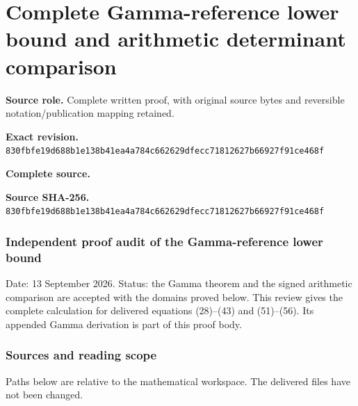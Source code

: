 \begingroup

\section{Complete Gamma-reference lower bound and arithmetic determinant comparison}


\begingroup
\sloppy
\small

\noindent\textbf{Source role.} Complete written proof, with original source bytes and reversible notation/publication mapping retained.\par
\noindent\textbf{Exact revision.} \nolinkurl{830fbfe19d688b1e138b41ea4a784c662629dfecc71812627b66927f91ce468f}\par
\noindent\textbf{Complete source.} \par
\noindent\textbf{Source SHA-256.} \nolinkurl{830fbfe19d688b1e138b41ea4a784c662629dfecc71812627b66927f91ce468f}\par\medskip
\subsubsection{Independent proof audit of the Gamma-reference lower bound}\label{endpoint-gamma_review--independent-proof-audit-of-the-gamma-reference-lower-bound}

Date: 13 September 2026. Status: the Gamma theorem and the signed arithmetic comparison are accepted with the domains proved below. This review gives the complete calculation for delivered equations (28)--(43) and (51)--(56). Its appended Gamma derivation is part of this proof body.

\subsubsection{Sources and reading scope}\label{endpoint-gamma_review--sources-and-reading-scope}

Paths below are relative to the mathematical workspace. The delivered files have not been changed.

